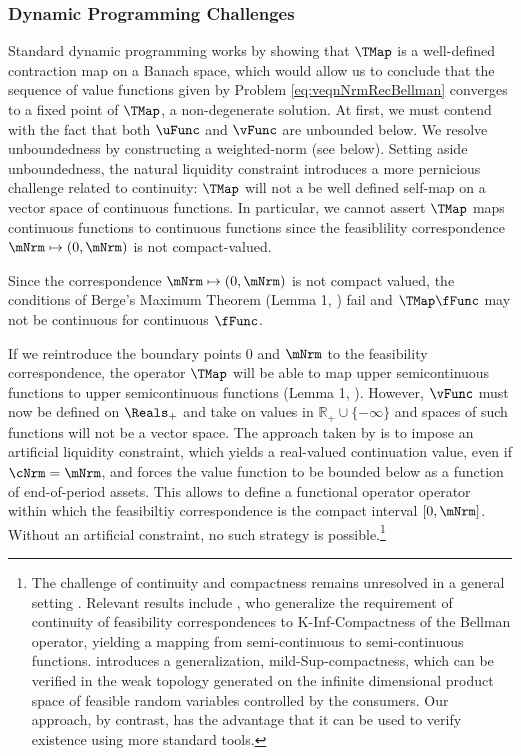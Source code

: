 \documentclass[BufferStockTheory]{subfiles}
\begin{document}
\subsubsection{Dynamic Programming Challenges}\label{subsubsec:challengesDP} \hypertarget{challengesDP}{} Standard dynamic programming \citep{stachurski2022} works by showing that $\TMap$ is a well-defined contraction map on a Banach space, which would allow us to conclude that the sequence of value functions given by Problem \ref{eq:veqnNrmRecBellman} converges to a fixed point of $\TMap$, a non-degenerate solution. At first, we must contend with the fact that both $\uFunc$ and $\vFunc$ are unbounded below. We resolve unboundedness by constructing a weighted-norm (see below). Setting aside unboundedness, the natural liquidity constraint introduces a more pernicious challenge related to continuity: $\TMap$ will not a be well defined self-map on a vector space of continuous functions. In particular, we cannot assert $\TMap$ maps continuous functions to continuous functions since the feasiblility correspondence $\mNrm\mapsto (0, \mNrm)$ is not compact-valued.

\begin{remark}\label{remark:notCompact}
Since the correspondence $\mNrm\mapsto (0, \mNrm)$ is not compact valued, the conditions of Berge's Maximum Theorem (Lemma 1, \cite{Jaskiewicz2011}) fail and $\TMap \fFunc$ may not be continuous for continuous $\fFunc$.
\end{remark}

If we reintroduce the boundary points $0$ and $\mNrm$ to the feasibility correspondence, the operator $\TMap$ will be able to map upper semicontinuous functions to upper semicontinuous functions (Lemma 1, \cite{Jaskiewicz2011}). However, $\vFunc$ must now be defined on $\Reals_{+}$ and take on values in $\mathbb{R}_{+}\cup\{-\infty\}$ and spaces of such functions will not be a vector space. The approach taken by \cite{Ma2022} is to impose an artificial liquidity constraint, which yields a real-valued continuation value, even if $\cNrm= \mNrm$, and forces the value function to be bounded below as a function of end-of-period assets. This allows \cite{Ma2022} to define a functional operator operator within which the feasibiltiy correspondence is the compact interval $[0, \mNrm]$. Without an artificial constraint, no such strategy is possible.\footnote{The challenge of continuity and compactness remains unresolved in a general setting \citep{rinconZapatero2024}. Relevant results include \cite{Feinberg2012}, who generalize the requirement of continuity of feasibility correspondences to K-Inf-Compactness of the Bellman operator, yielding a mapping from semi-continuous to semi-continuous functions. \cite{Shanker2017a} introduces a generalization, mild-Sup-compactness, which can be verified in the weak topology generated on the infinite dimensional product space of feasible random variables controlled by the consumers. Our approach, by contrast, has the advantage that it can be used to verify existence using more standard tools.} 
\end{document}
